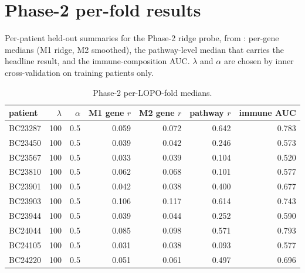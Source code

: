 \section{Phase-2 per-fold results}
{\sloppy Per-patient held-out summaries for the Phase-2 ridge probe, from : per-gene medians (M1 ridge, M2 smoothed), the pathway-level median that carries the headline result, and the immune-composition AUC. $\lambda$ and $\alpha$ are chosen by inner cross-validation on training patients only.\par}
\begin{table}[h]\centering\small\caption{Phase-2 per-LOPO-fold medians.}\label{tab:p2folds}
\begin{tabular}{lrrrrrr}\hline\hline patient & $\lambda$ & $\alpha$ & M1 gene $r$ & M2 gene $r$ & pathway $r$ & immune AUC\\\hline
BC23287 & 100 & 0.5 & 0.059 & 0.072 & 0.642 & 0.783\\
BC23450 & 100 & 0.5 & 0.039 & 0.042 & 0.246 & 0.573\\
BC23567 & 100 & 0.5 & 0.033 & 0.039 & 0.104 & 0.520\\
BC23810 & 100 & 0.5 & 0.062 & 0.068 & 0.101 & 0.577\\
BC23901 & 100 & 0.5 & 0.042 & 0.038 & 0.400 & 0.677\\
BC23903 & 100 & 0.5 & 0.106 & 0.117 & 0.614 & 0.743\\
BC23944 & 100 & 0.5 & 0.039 & 0.044 & 0.252 & 0.590\\
BC24044 & 100 & 0.5 & 0.085 & 0.098 & 0.571 & 0.793\\
BC24105 & 100 & 0.5 & 0.031 & 0.038 & 0.093 & 0.577\\
BC24220 & 100 & 0.5 & 0.051 & 0.061 & 0.497 & 0.696\\
\hline\end{tabular}\end{table}
